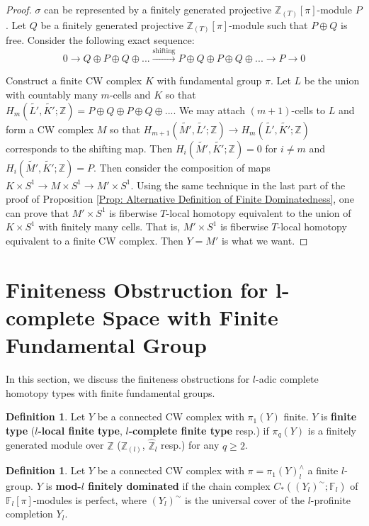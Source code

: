 \documentclass[11pt]{amsart}
\theoremstyle{definition}
\newtheorem{definition}[theorem]{Definition}
\numberwithin{equation}{section}
\numberwithin{equation}{section}
\newcommand\ZZ{\mathbb{Z}}
\newcommand\FF{\mathbb{F}}
\begin{document}
\begin{proof}
$\sigma$ can be represented by a finitely generated projective $\ZZ_{(T)}[\pi]$-module $P$. Let $Q$ be a finitely generated projective $\ZZ_{(T)}[\pi]$-module such that $P\oplus Q$ is free. Consider the following exact sequence:
\[
0\rightarrow Q\oplus P\oplus Q\oplus ...\xrightarrow{\text{shifting}} P\oplus Q\oplus P\oplus Q\oplus ...\rightarrow P\rightarrow 0 
\]

Construct a finite CW complex $K$ with fundamental group $\pi$. Let $L$ be the union with countably many $m$-cells and $K$ so that $H_m(\widetilde{L'},\widetilde{K'};\ZZ)=P\oplus Q\oplus P\oplus Q\oplus ...$. We may attach $(m+1)$-cells to $L$ and form a CW complex $M$ so that $H_{m+1}(\widetilde{M'},\widetilde{L'};\ZZ)\rightarrow H_m(\widetilde{L'},\widetilde{K'};\ZZ)$ corresponds to the shifting map. Then $H_i(\widetilde{M'},\widetilde{K'};\ZZ)=0$ for $i\neq m$ and $H_i(\widetilde{M'},\widetilde{K'};\ZZ)=P$. Then consider the composition of maps $K\times S^1\rightarrow M\times S^1\rightarrow M'\times S^1$. Using the same technique in the last part of the proof of Proposition \ref{Prop: Alternative Definition of Finite Dominatedness}, one can prove that $M'\times S^1$ is fiberwise $T$-local homotopy equivalent to the union of $K\times S^1$ with finitely many cells. That is, $M'\times S^1$ is fiberwise $T$-local homotopy equivalent to a finite CW complex. Then $Y=M'$ is what we want.
\end{proof}

\section{Finiteness Obstruction for l-complete Space with Finite Fundamental Group}\label{Section: Complete Finiteness}

In this section, we discuss the finiteness obstructions for $l$-adic complete homotopy types with finite fundamental groups.

\begin{definition}
Let $Y$ be a connected CW complex with $\pi_1(Y)$ finite. $Y$ is \textbf{finite type} (\textbf{$l$-local finite type}, \textbf{$l$-complete finite type} resp.) if $\pi_q(Y)$ is a finitely generated module over $\ZZ$ ($\ZZ_{(l)}$, $\widehat{\ZZ}_l$ resp.) for any $q\geq 2$.
\end{definition}

\begin{definition}\label{Def: mod-l finitely dominated}
Let $Y$ be a connected CW complex with $\pi=\pi_1(Y)^{\wedge}_l$ a finite $l$-group. $Y$ is \textbf{mod-$l$ finitely dominated} if the chain complex $C_*((Y_l)^{\sim};\FF_l)$ of $\FF_l[\pi]$-modules is perfect, where $(Y_l)^{\sim}$ is the universal cover of the $l$-profinite completion $Y_l$.
\end{definition}
\end{document}

